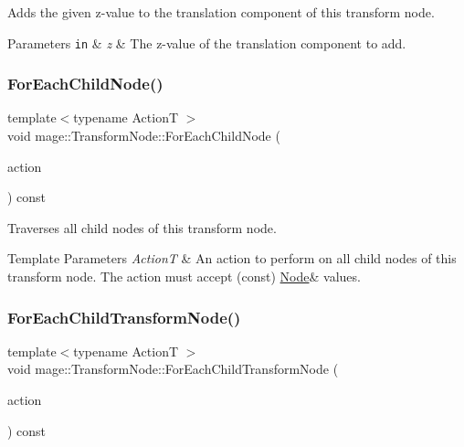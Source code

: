 Adds the given z-\/value to the translation component of this transform node.


\begin{DoxyParams}[1]{Parameters}
\mbox{\tt in}  & {\em z} & The z-\/value of the translation component to add. \\
\hline
\end{DoxyParams}
\hypertarget{classmage_1_1_transform_node_a3dd36b373d27e3526df562ba899f721f}{}\label{classmage_1_1_transform_node_a3dd36b373d27e3526df562ba899f721f} 
\subsubsection{\texorpdfstring{For\+Each\+Child\+Node()}{ForEachChildNode()}}
{\footnotesize\ttfamily template$<$typename ActionT $>$ \\
void mage\+::\+Transform\+Node\+::\+For\+Each\+Child\+Node (\begin{DoxyParamCaption}\item[{ActionT}]{action }\end{DoxyParamCaption}) const\hspace{0.3cm}{\ttfamily [private]}}

Traverses all child nodes of this transform node.


\begin{DoxyTemplParams}{Template Parameters}
{\em ActionT} & An action to perform on all child nodes of this transform node. The action must accept ({\ttfamily const}) {\ttfamily \hyperlink{classmage_1_1_node}{Node}\&} values. \\
\hline
\end{DoxyTemplParams}
\hypertarget{classmage_1_1_transform_node_ad9c166b58e3718125d2a51827f8d7ca2}{}\label{classmage_1_1_transform_node_ad9c166b58e3718125d2a51827f8d7ca2} 
\subsubsection{\texorpdfstring{For\+Each\+Child\+Transform\+Node()}{ForEachChildTransformNode()}}
{\footnotesize\ttfamily template$<$typename ActionT $>$ \\
void mage\+::\+Transform\+Node\+::\+For\+Each\+Child\+Transform\+Node (\begin{DoxyParamCaption}\item[{ActionT}]{action }\end{DoxyParamCaption}) const\hspace{0.3cm}{\ttfamily [private]}}

